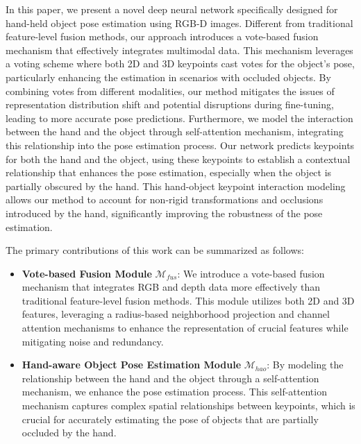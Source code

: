 In this paper, we present a novel deep neural network specifically designed for hand-held object pose estimation using RGB-D images. Different from traditional feature-level fusion methods, our approach introduces a vote-based fusion mechanism that effectively integrates multimodal data. This mechanism leverages a voting scheme where both 2D and 3D keypoints cast votes for the object's pose, particularly enhancing the estimation in scenarios with occluded objects. By combining votes from different modalities, our method mitigates the issues of representation distribution shift and potential disruptions during fine-tuning, leading to more accurate pose predictions. Furthermore, we model the interaction between the hand and the object through self-attention mechanism, integrating this relationship into the pose estimation process. Our network predicts keypoints for both the hand and the object, using these keypoints to establish a contextual relationship that enhances the pose estimation, especially when the object is partially obscured by the hand. This hand-object keypoint interaction modeling allows our method to account for non-rigid transformations and occlusions introduced by the hand, significantly improving the robustness of the pose estimation.

The primary contributions of this work can be summarized as follows:

\begin{itemize}

\item \textbf{Vote-based Fusion Module} $\mathcal{M}_{fus}$: We introduce a vote-based fusion mechanism that integrates RGB and depth data more effectively than traditional feature-level fusion methods. This module utilizes both 2D and 3D features, leveraging a radius-based neighborhood projection and channel attention mechanisms to enhance the representation of crucial features while mitigating noise and redundancy. \\

\item \textbf{Hand-aware Object Pose Estimation Module} $\mathcal{M}_{hao}$: By modeling the relationship between the hand and the object through a self-attention mechanism, we enhance the pose estimation process. This self-attention mechanism captures complex spatial relationships between keypoints, which is crucial for accurately estimating the pose of objects that are partially occluded by the hand.

\end{itemize}